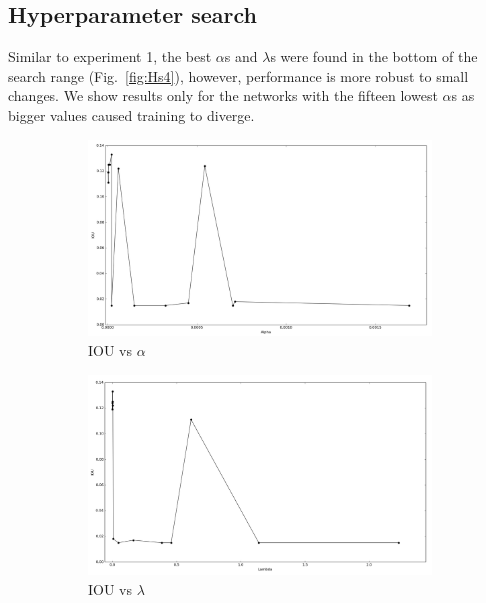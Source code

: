 \subsection{Hyperparameter search}
Similar to experiment 1, the best $\alpha$s and $\lambda$s were found in the bottom of the search range (Fig.~\ref{fig:Hs4}), however, performance is more robust to small changes. We show results only for the networks with the fifteen lowest $\alpha$s as bigger values caused training to diverge.
\begin{figure}[h]
	\centering
	\begin{subfigure}{0.32\textwidth}
		\centering
                \includegraphics[width=\textwidth]{plots/hs4_alpha.png}
         \caption{IOU vs $\alpha$}
	\end{subfigure}
	\begin{subfigure}{0.32\textwidth}
		\centering
                \includegraphics[width=\textwidth]{plots/hs4_lambda.png}
         \caption{IOU vs $\lambda$}
	\end{subfigure}
	\begin{subfigure}{0.32\textwidth}

\end{subfigure}
\end{figure}
